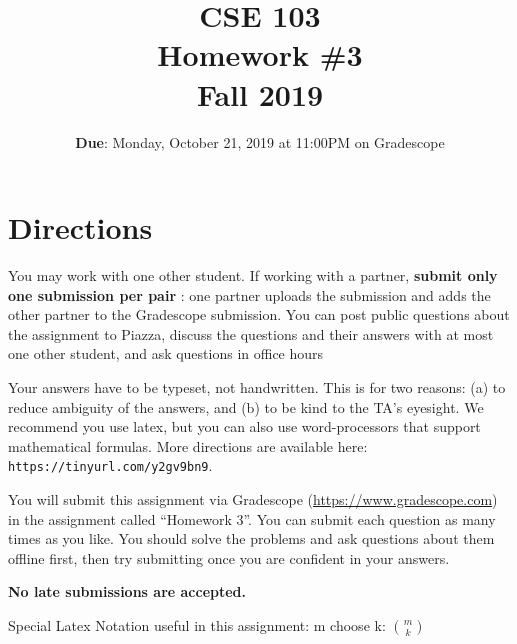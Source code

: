 \documentclass[12pt, oneside]{article}
\title{\bf CSE 103 \\[2ex]
       \Large Homework \#3\\ Fall 2019}
\begin{document}
\date{\textbf{Due}: Monday, October 21, 2019 at 11:00PM on Gradescope}
\maketitle

\section{Directions}
You may work with one other student. If working with a partner,
\textbf{submit only one submission per pair} : one partner uploads the submission and adds the other partner to the Gradescope submission. You can post public questions about the assignment to Piazza, discuss the questions and their answers with at most one other student, and ask questions in office hours

Your answers have to be typeset, not handwritten. This is for two
reasons: (a) to reduce ambiguity of the answers, and (b) to be kind to
the TA's eyesight. We recommend you use latex, but you can also use
word-processors that support mathematical formulas. More directions
are available here: {\tt https://tinyurl.com/y2gv9bn9}.

You will submit this assignment via Gradescope
(\url{https://www.gradescope.com}) in the assignment called ``Homework
3''. You can submit each question as many times as you like. You should solve the problems and ask questions about them offline first, then try submitting once you are confident in your answers. 

\textbf{No late submissions are accepted.}

Special Latex Notation useful in this assignment: m choose k: ${m
  \choose k}$
  \newpage
\end{document}

